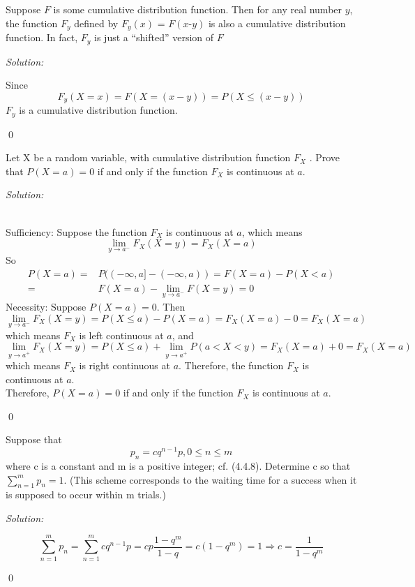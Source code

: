 \documentclass[12pt]{article}
\newenvironment{problem}[2][Problem]{\begin{trivlist}
\item[\hskip \labelsep {\bfseries #1}\hskip \labelsep {\bfseries #2.}]}{\end{trivlist}}
\newenvironment{sol}
    {\emph{Solution:}
    }
    {
    \qed
    }
\begin{document}
\begin{problem}{6}
Suppose $F$ is some cumulative distribution function. Then for any real number $y$, the
function $F_{y}$ defined by $F_{y}(x)$ = $F(x\text{-}  y)$ is also a cumulative distribution function. In fact, $F_{y}$ is just a “shifted” version of $F$
\end{problem}
\begin{sol}
Since
\[
F_y(X=x)=F(X=(x-y))=P(X\leq(x-y))
\]
$F_y$ is a cumulative distribution function.
\end{sol}



\begin{problem}{7}
Let X be a random variable, with cumulative distribution function $F_{X}$ . Prove
that $P(X = a) = 0$ if and only if the function $F_{X}$ is continuous at $a$.
\end{problem}
\begin{sol}
\\Sufficiency: Suppose the function $F_X$ is continuous at $a$, which means
\[
\lim_{y\to a^-}F_X(X=y)=F_X(X=a)
\]
So
\begin{align*}
P(X=a)=&P((-\infty,a]-(-\infty,a))=F(X=a)-P(X<a)\\
=&F(X=a)-\lim_{y\to a^-}F(X=y)=0
\end{align*}
Necessity: Suppose $P(X=a)=0$. Then
\[
\lim_{y\to a^-}F_X(X=y)=P(X\leq a)-P(X=a)=F_X(X=a)-0=F_X(X=a)
\]
which means $F_X$ is left continuous at $a$, and
\[
\lim_{y\to a^+}F_X(X=y)=P(X\leq a)+\lim_{y\to a^+}P(a<X<y)=F_X(X=a)+0=F_X(X=a)
\]
which means $F_X$ is right continuous at $a$. Therefore, the function $F_X$ is continuous at $a$.\\
Therefore, $P(X = a) = 0$ if and only if the function $F_{X}$ is continuous at $a$.
\end{sol}


\begin{problem}{8}
Suppose that
$$p_{n} = cq^{n-1}p, 0 \leq n\leq m$$
where c is a constant and m is a positive integer; cf. (4.4.8). Determine
c so that $\sum_{n=1}^m p_{n}=1$. (This scheme corresponds to the waiting time
for a success when it is supposed to occur within m trials.)

\end{problem}
\begin{sol}
\[
\sum_{n=1}^{m}p_n=\sum_{n=1}^{m}cq^{n-1}p=cp\frac{1-q^m}{1-q}=c(1-q^m)=1\Longrightarrow c=\frac{1}{1-q^m}
\]
\end{sol}
\end{document}
